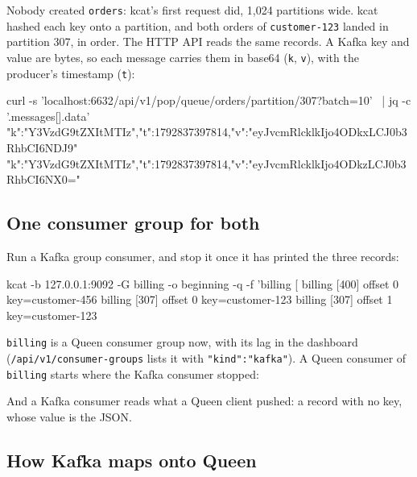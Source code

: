 Nobody created \texttt{orders}: kcat's first request did, 1,024 partitions wide. kcat hashed each key
onto a partition, and both orders of \texttt{customer-123} landed in partition 307, in order. The
HTTP API reads the same records. A Kafka key and value are bytes, so each message carries them in
base64 (\texttt{k}, \texttt{v}), with the producer's timestamp (\texttt{t}):

\begin{shell}
curl -s 'localhost:6632/api/v1/pop/queue/orders/partition/307?batch=10' \
  | jq -c '.messages[].data'
{"k":"Y3VzdG9tZXItMTIz","t":1792837397814,"v":"eyJvcmRlcklkIjo4ODkxLCJ0b3RhbCI6NDJ9"}
{"k":"Y3VzdG9tZXItMTIz","t":1792837397814,"v":"eyJvcmRlcklkIjo4ODkzLCJ0b3RhbCI6NX0="}
\end{shell}

\subsection{One consumer group for both}

Run a Kafka group consumer, and stop it once it has printed the three records:

\begin{shell}
kcat -b 127.0.0.1:9092 -G billing -o beginning -q -f 'billing [%
billing [400] offset 0 key=customer-456
billing [307] offset 0 key=customer-123
billing [307] offset 1 key=customer-123
\end{shell}

\texttt{billing} is a Queen consumer group now, with its lag in the dashboard
(\texttt{/api/v1/\allowbreak consumer-groups} lists it with \texttt{"kind":"kafka"}). A Queen consumer of \texttt{billing}
starts where the Kafka consumer stopped:


And a Kafka consumer reads what a Queen client pushed: a record with no key, whose value is the JSON.

\subsection{How Kafka maps onto Queen}

